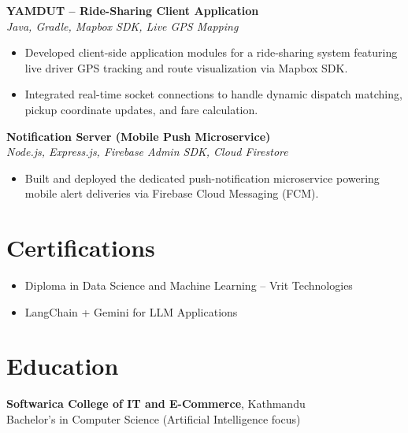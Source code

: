\documentclass[a4paper,10pt]{article}
\begin{document}
\vspace{3pt}
\textbf{YAMDUT -- Ride-Sharing Client Application} \\
\textit{Java, Gradle, Mapbox SDK, Live GPS Mapping}
\begin{itemize}
    \item Developed client-side application modules for a ride-sharing system featuring live driver GPS tracking and route visualization via Mapbox SDK.
    \item Integrated real-time socket connections to handle dynamic dispatch matching, pickup coordinate updates, and fare calculation.
\end{itemize}

\vspace{3pt}
\textbf{Notification Server (Mobile Push Microservice)} \\
\textit{Node.js, Express.js, Firebase Admin SDK, Cloud Firestore}
\begin{itemize}
    \item Built and deployed the dedicated push-notification microservice powering mobile alert deliveries via Firebase Cloud Messaging (FCM).
\end{itemize}

\section*{Certifications}
\begin{itemize}
    \item Diploma in Data Science and Machine Learning -- Vrit Technologies
    \item LangChain + Gemini for LLM Applications
\end{itemize}

\section*{Education}
\textbf{Softwarica College of IT and E-Commerce}, Kathmandu \\
Bachelor's in Computer Science (Artificial Intelligence focus)
\end{document}
